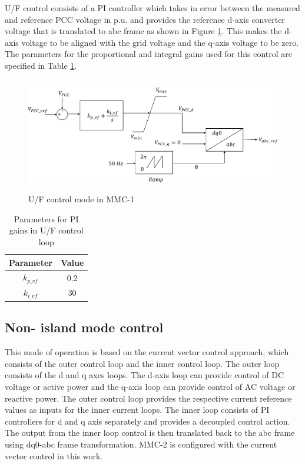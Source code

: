 U/F control consists of a \gls{PI} controller which takes in error between the measured and reference \gls{PCC} voltage in p.u. and provides the reference d-axis converter voltage that is translated to abc frame as shown in Figure \ref{fig:U_F_control}. This makes the d-axis voltage to be aligned with the grid voltage and the q-axis voltage to be zero. The parameters for the proportional and integral gains used for this control are specified in Table \ref{tab:U_F_para}. 

\begin{figure}[H]
\centering
    \includegraphics[height = 5cm,width = 12.5cm]{Diagrams/Chapter_4/U_F_control.pdf}
    \caption{U/F control mode in MMC-1 \cite{vrana2013cigre}}
    \label{fig:U_F_control}
\end{figure}

\begin{table}[H]
\centering
\begin{tabular}{|c|c|}
\hline
Parameter & Value \\ \hline
$k_{p\_vf}$     & 0.2 \\ \hline
$k_{i\_vf}$     & 30 \\ \hline
\end{tabular}
\caption{Parameters for PI gains in U/F control loop \cite{vrana2013cigre}}
\label{tab:U_F_para}
\end{table}

\subsection{Non- island mode control}
This mode of operation is based on the current vector control approach, which consists of the outer control loop and the inner control loop. The outer loop consists of the d and q axes loops. The d-axis loop can provide control of \gls{DC} voltage or active power and the q-axis loop can provide control of \gls{AC} voltage or reactive power. The outer control loop provides the respective current reference values as inputs for the inner current loops. The inner loop consists of \gls{PI} controllers for d and q axis separately and provides a decoupled control action. The output from the inner loop control is then translated back to the abc frame using dq0-abc frame transformation. \gls{MMC}-2 is configured with the current vector control in this work. 

